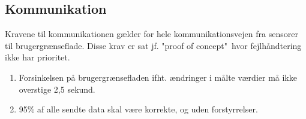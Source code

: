 \subsection{Kommunikation}
Kravene til kommunikationen gælder for hele kommunikationsvejen fra sensorer til brugergrænseflade. Disse krav er sat jf. "proof of concept"\, hvor fejlhåndtering ikke har prioritet. 
\begin{enumerate}
	\item Forsinkelsen på brugergrænsefladen ifht. ændringer i målte værdier må ikke overstige 2,5 sekund. 
	\item 95\% af alle sendte data skal være korrekte, og uden forstyrrelser. 
\end{enumerate}

